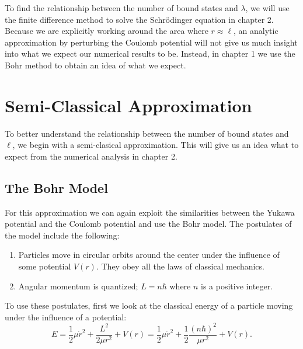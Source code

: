 \documentclass[12pt,twoside]{reedthesis}
\newcommand{\eqn}[1]{\begin{equation}#1\end{equation}}
\begin{document}
To find the relationship between the number of bound states and $\lambda$, we will use the finite difference method to solve the Schr\"odinger equation in chapter 2. Because we are explicitly working around the area where $r \approx \ell$, an analytic approximation by perturbing the Coulomb potential \cite{PhysRevLett.66.1310} will not give us much insight into what we expect our numerical results to be. Instead, in chapter 1 we use the Bohr method to obtain an idea of what we expect.

\clearpage %

\chapter{Semi-Classical Approximation}
To better understand the relationship between the number of bound states and $\ell$, we begin with a semi-clasical approximation. This will give us an idea what to expect from the numerical analysis in chapter 2.
\section{The Bohr Model}
For this approximation we can again exploit the similarities between the Yukawa potential and the Coulomb potential and use the Bohr model. 
The postulates of the model include the following:
\begin{enumerate}
\item Particles move in circular orbits around the center under the influence of some potential $V(r)$. They obey all the laws of classical mechanics.
\item Angular momentum is quantized; $L = n\hbar$ where $n$ is a positive integer.
\end{enumerate}

To use these postulates, first we look at the classical energy of a particle moving under the influence of a potential:
\eqn{
E = \frac{1}{2} \mu \dot{r}^2 + \frac{L^2}{2 \mu r^2} + V(r) = \frac{1}{2}\mu \dot{r}^2+\frac{1}{2}\frac{(n \hbar)^2}{\mu r^2}+V(r)\mbox{.}
\label{eq:classical-energy}
}
\end{document}
